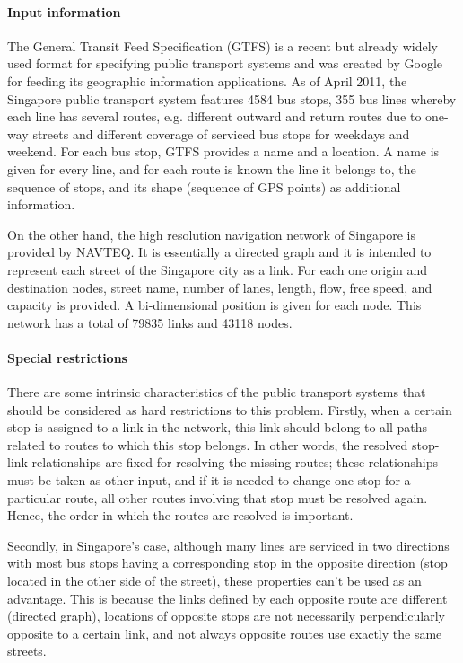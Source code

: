 \paragraph{Input information}

The General Transit Feed Specification (GTFS) is a recent but already widely used format for specifying public transport systems and was created by Google for feeding its geographic information applications. As of April 2011, the Singapore public transport system features 4584 bus stops, 355 bus lines whereby each line has several routes, e.g. different outward and return routes due to one-way streets and different coverage of serviced bus stops for weekdays and weekend. For each bus stop, GTFS provides a name and a location. A name is given for every line, and for each route is known the line it belongs to, the sequence of stops, and its shape (sequence of GPS points) as additional information.

On the other hand, the high resolution navigation network of Singapore is provided by NAVTEQ. It is essentially a directed graph and it is intended to represent each street of the Singapore city as a link. For each one origin and destination nodes, street name, number of lanes, length, flow, free speed, and capacity is provided. A bi-dimensional position is given for each node. This network has a total of 79835 links and 43118 nodes.

\paragraph{Special restrictions}

There are some intrinsic characteristics of the public transport systems that should be considered as hard restrictions to this problem. Firstly, when a certain stop is assigned to a link in the network, this link should belong to all paths related to routes to which this stop belongs. In other words, the resolved stop-link relationships are fixed for resolving the missing routes; these relationships must be taken as other input, and if it is needed to change one stop for a particular route, all other routes involving that stop must be resolved again. Hence, the order in which the routes are resolved is important.

Secondly, in Singapore's case, although many lines are serviced in two directions with most bus stops having a corresponding stop in the opposite direction (stop located in the other side of the street), these properties can't be used as an advantage. This is because the links defined by each opposite route are different (directed graph), locations of opposite stops are not necessarily perpendicularly opposite to a certain link, and not always opposite routes use exactly the same streets.

